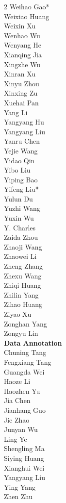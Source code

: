 \documentclass{article}
\begin{document}
\begin{multicols}{2}
Weihao Gao* \\
Weixiao Huang \\
Weixin Xu \\
Wenhao Wu \\
Wenyang He \\
Xianqing Jia \\
Xingzhe Wu \\
Xinran Xu \\
Xinyu Zhou \\
Xinxing Zu \\
Xuehai Pan \\
Yang Li \\
Yangyang Hu \\
Yangyang Liu \\
Yanru Chen \\
Yejie Wang \\
Yidao Qin \\
Yibo Liu \\
Yiping Bao \\
Yifeng Liu* \\
Yulun Du \\
Yuzhi Wang \\
Yuxin Wu \\
Y. Charles \\
Zaida Zhou \\
Zhaoji Wang \\
Zhaowei Li \\
Zheng Zhang \\
Zhexu Wang \\
Zhiqi Huang \\
Zhilin Yang \\
Zihao Huang \\
Ziyao Xu \\
Zonghan Yang \\
Zongyu Lin \\

\noindent
\textbf{Data Annotation} \\

Chuning Tang \\
Fengxiang Tang  \\
Guangda Wei \\
Haoze Li \\
Haozhen Yu \\
Jia Chen \\
Jianhang Guo \\
Jie Zhao \\
Junyan Wu \\
Ling Ye \\
Shengling Ma \\
Siying Huang \\
Xianghui Wei \\
Yangyang Liu \\
Ying Yang \\
Zhen Zhu \\

\end{multicols}
\end{document}
